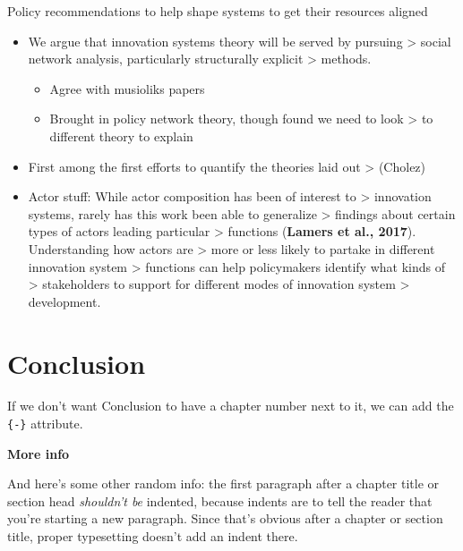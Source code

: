 \documentclass[twoside,12pt,final]{ucthesis-CA2012}
\providecommand{\tightlist}{%
  \setlength{\itemsep}{0pt}\setlength{\parskip}{0pt}}
\begin{document}
\begin{ucmainmatter}
Policy recommendations to help shape systems to get their resources
aligned
\begin{itemize}
\item
  We argue that innovation systems theory will be served by pursuing
  \textgreater{} social network analysis, particularly structurally explicit
  \textgreater{} methods.
  \begin{itemize}
  \item
    Agree with musiolik\textquotesingle s papers
  \item
    Brought in policy network theory, though found we need to look
    \textgreater{} to different theory to explain
  \end{itemize}
\item
  First among the first efforts to quantify the theories laid out
  \textgreater{} (Cholez)
\end{itemize}
\begin{itemize}
\tightlist
\item
  Actor stuff: While actor composition has been of interest to
  \textgreater{} innovation systems, rarely has this work been able to generalize
  \textgreater{} findings about certain types of actors leading particular
  \textgreater{} functions (\textbf{Lamers et al., 2017}). Understanding how actors are
  \textgreater{} more or less likely to partake in different innovation system
  \textgreater{} functions can help policymakers identify what kinds of
  \textgreater{} stakeholders to support for different modes of innovation system
  \textgreater{} development.
\end{itemize}
\hypertarget{conclusion}{%
\chapter*{Conclusion}\label{conclusion}}

If we don't want Conclusion to have a chapter number next to it, we can add the \texttt{\{-\}} attribute.

\textbf{More info}

And here's some other random info: the first paragraph after a chapter title or section head \emph{shouldn't be} indented, because indents are to tell the reader that you're starting a new paragraph. Since that's obvious after a chapter or section title, proper typesetting doesn't add an indent there.

\appendix

\hypertarget{the-first-appendix}{%
}
\end{ucmainmatter}
\end{document}
